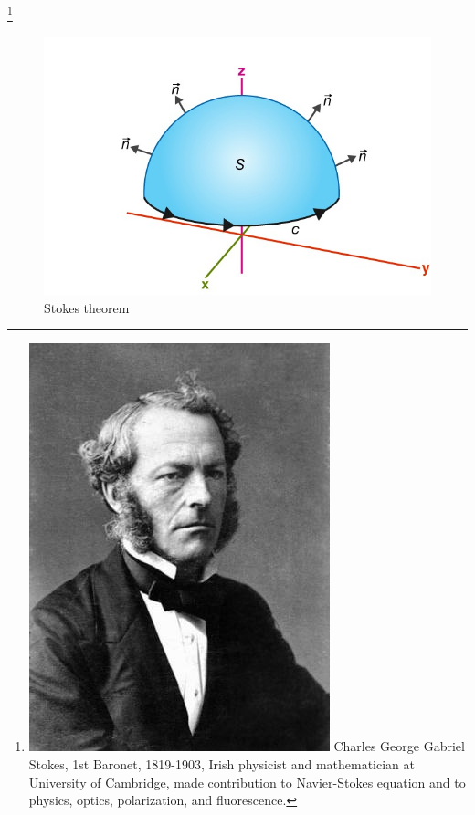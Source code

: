 \footnote{
\includegraphics[scale=0.05]{graphics/georgestokes.png}
Charles George Gabriel Stokes, 1st Baronet, 1819-1903, Irish physicist and mathematician at University of Cambridge, made contribution to Navier-Stokes equation and to physics, optics, polarization, and fluorescence.
}

\begin{figure}
\centering
\includegraphics[width=0.7\linewidth]{graphics/fig17.8}
\caption{Stokes theorem}
\end{figure}


